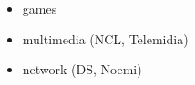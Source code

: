 \documentclass[pdftex,12pt,a4paper]{article}
\newcommand{\CEU}{\textsc{C\'{e}u}\xspace}
\begin{document}
\begin{itemize}
    \item games
    \item multimedia (NCL, Telemidia)
    \item network (DS, Noemi)
\end{itemize}

\begin{comment}

%
However, for soft real-time reactive systems, deadlines are not strict
Most general purpose reactive systems have soft real-time requirements,
(in contrast with hard real-time systems)
For hard real-time reactive systems, missing a critical scheduling deadline is 
unacceptable (e.g. a thread that controls the XXX for an aircraft).

although missing a deadline is undesired, xxx
control of an airplane

For soft real-time systems XXX

Our proposal aims to embrace the two limitation in the synchronous model
general-purpose, not hard
- combination of synchronous/asynchronous
- memory pools


FRP, depends on memory allocation
- our work

two sides of the spectrum
Ceu -> LuaGravity

static, compiler

dynamic, runtime

- reactive systems
    - emerging broad use \cite
    - embedded systems
    - guis, servers

- synchronous languages
    - ES: esterel
    - GP: FRP, elm
    - me: ceu, gvt

Software for embedded systems is usually developed in the C programming 
language, and the addition of a real-time operating system may extend it with 
preemptive and/or cooperative multithreading \cite{wsn.contiki,wsn.tos}.
However, concurrency in C requires a low-level exercise related to scheduling, 
synchronizing, and the life cycle of activities (i.e. creating and destroying 
threads).
%
Concurrency in C also lacks safety warranties, given that they are susceptible 
to unbounded execution, race conditions and deadlocks.
Nonetheless, safety is a fundamental  aspect in embedded systems, which have 
scarce resources and must run for long periods without human intervention.

The programming language \CEU~\cite{ceu.sensys13} developed as part of the 
proponent's PhD research in PUC--Rio is targeted at highly constrained embedded 
systems (such as Wireless Sensor Networks~\cite{wsn.survey}) and incorporates
features found in dataflow and imperative reactive languages 
\cite{lustre.ieee91, esterel.design}.
%
\CEU supports concurrent lines of execution that run in time steps and are 
allowed to share variables.
However, the synchronous and static nature of \CEU enables a compile time 
analysis that can enforce deterministic and memory-safe programs, offering a 
high-level and safe alternative to the predominating C based multithreaded 
systems.
The \CEU compiler generates code comparable to handcrafted C programs in terms 
of size and portability.


\end{comment}
\end{document}
